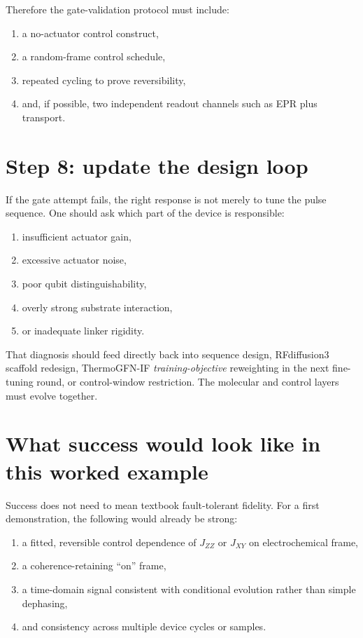 \documentclass[11pt]{report}
\theoremstyle{definition}
\begin{document}
Therefore the gate-validation protocol must include:

\begin{enumerate}[leftmargin=2em]
\item a no-actuator control construct,
\item a random-frame control schedule,
\item repeated cycling to prove reversibility,
\item and, if possible, two independent readout channels such as EPR plus transport.
\end{enumerate}

\section{Step 8: update the design loop}
If the gate attempt fails, the right response is not merely to tune the pulse sequence. One should ask which part of the device is responsible:

\begin{enumerate}[leftmargin=2em]
\item insufficient actuator gain,
\item excessive actuator noise,
\item poor qubit distinguishability,
\item overly strong substrate interaction,
\item or inadequate linker rigidity.
\end{enumerate}

That diagnosis should feed directly back into sequence design, RFdiffusion3 scaffold redesign, ThermoGFN-IF \emph{training-objective} reweighting in the next fine-tuning round, or control-window restriction. The molecular and control layers must evolve together.

\section{What success would look like in this worked example}
Success does not need to mean textbook fault-tolerant fidelity. For a first demonstration, the following would already be strong:

\begin{enumerate}[leftmargin=2em]
\item a fitted, reversible control dependence of $J_{ZZ}$ or $J_{XY}$ on electrochemical frame,
\item a coherence-retaining ``on'' frame,
\item a time-domain signal consistent with conditional evolution rather than simple dephasing,
\item and consistency across multiple device cycles or samples.
\end{enumerate}
\end{document}
